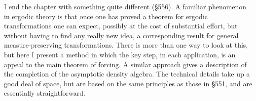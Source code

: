 I end the chapter with something quite different (\S556).
A familiar phenomenon
in ergodic theory is that once one has proved a theorem for ergodic
transformations one can expect, possibly at the cost of substantial effort,
but without having to find any really new idea, a corresponding result
for general measure-preserving transformations.
There is more than one way to look at this, but here I present a method in
which the key step, in each application,
is an appeal to the main theorem of forcing.   A similar approach gives a
description of the completion of the asymptotic density algebra.   The
technical details take up a good deal of space, but are based on the same
principles as those in \S551, and are essentially straightforward.

\discrpage

